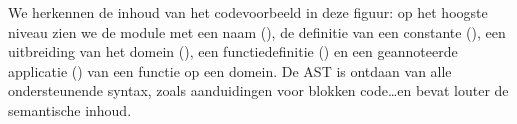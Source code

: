 We herkennen de inhoud van het codevoorbeeld in deze figuur: op het hoogste
niveau zien we de module met een naam (), de definitie van een
constante (), een uitbreiding van het domein (), een
functiedefinitie () en een geannoteerde applicatie
() van een functie op een domein. De AST is ontdaan van alle
ondersteunende syntax, zoals aanduidingen voor blokken code\dots en bevat
louter de semantische inhoud.
